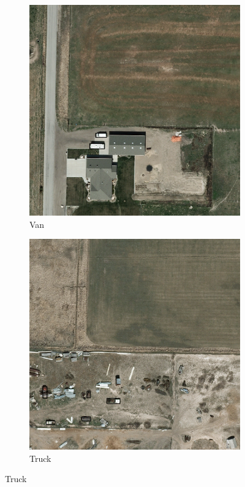 \begin{figure}[h!]
    \centering
    \begin{subfigure}[t]{0.38\textwidth}
        \centering
        \includegraphics[width=\linewidth]{images/015Results/01abb_vs_obb/comp_images/ground_truth_abb/198.png}
        \caption{Van}
    \end{subfigure}
    \begin{subfigure}[t]{0.38\textwidth}
        \centering
        \includegraphics[width=\linewidth]{images/015Results/01abb_vs_obb/comp_images/ground_truth_abb/212.png}
        \caption{Truck}
    \end{subfigure}
    

\end{figure}

